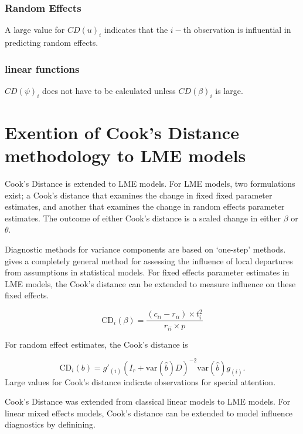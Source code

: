 \documentclass[12pt, a4paper]{report}
\theoremstyle{plain}
\theoremstyle{definition}
\theoremstyle{remark}
\begin{document}
		

		\subsubsection{Random Effects}
		
		A large value for $CD(u)_i$ indicates that the $i-$th observation is influential in predicting random effects.
		
		\subsubsection{linear functions}
		
		$CD(\psi)_i$ does not have to be calculated unless $CD(\beta)_i$ is large.
		
		


		\section{Exention of Cook's Distance methodology to LME models}
		 Cook's Distance is extended to LME models.  For LME models, two formulations exist; a Cook's distance that examines the change in fixed fixed parameter estimates, and another that examines the change in random effects parameter estimates. The outcome of either Cook's distance is a scaled change in either $\beta$ or $\theta$.
		
		Diagnostic methods for variance components are based on `one-step' methods. \citet{cook86} gives a completely general method for assessing the influence of local departures from assumptions in statistical models. For fixed effects parameter estimates in LME models, the  Cook's distance can be extended to measure influence on these fixed effects.
		
		\[
		\mbox{CD}_{i}(\beta) = \frac{(c_{ii} - r_{ii}) \times t^2_{i}}{r_{ii} \times p}
		\]
		
		For random effect estimates, the  Cook's distance is
		
		\[
		\mbox{CD}_{i}(b) = g{\prime}_{(i)} (I_{r} + \mbox{var}(\hat{b})D)^{-2}\mbox{var}(\hat{b})g_{(i)}.
		\]
		Large values for Cook's distance indicate observations for special attention.
		
		Cook's Distance was extended from classical linear models to LME models.  For linear mixed effects models, Cook's distance can be extended to model influence diagnostics by definining.
		
\end{document}
